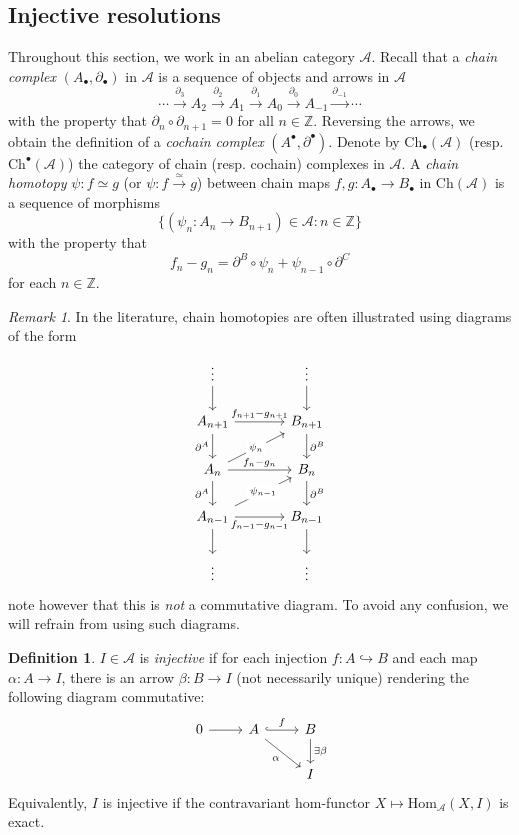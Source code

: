 \documentclass{article}
\def\~#1{\mathscr{#1}}
\def\To#1{\xrightarrow{#1}}
\numberwithin{equation}{section}
\numberwithin{figure}{section}
\newcommand{\Z}{\mathbb{Z}}
\newcommand{\Hom}{\mathrm{Hom}}
\newcommand{\mono}{\hookrightarrow}
\renewcommand{\d}{\partial}
\newcommand{\Ch}{\mathrm{Ch}}
\theoremstyle{plain}
\theoremstyle{definition}
\newtheorem{defn}[thm]{Definition}
\theoremstyle{remark}
\newtheorem*{rmk}{Remark}
\begin{document}
\subsection{Injective resolutions}
Throughout this section, we work in an abelian category $\~A$. Recall that a \emph{chain complex} $(A_\bullet, \d_\bullet)$ in $\~A$ is a sequence of objects and arrows in $\~A$
\[\cdots \To{\d_3} A_2 \To{\d_2} A_1 \To{\d_1} A_0 \To{\d_0} A_{-1} \To{\d_{-1}} \cdots\]
with the property that $\d_n \circ \d_{n+1} = 0$ for all $n \in \Z$. Reversing the arrows, we obtain the definition of a \emph{cochain complex} $(A^\bullet, \d^\bullet)$. Denote by $\Ch_\bullet(\~A)$ (resp. $\Ch^\bullet(\~A)$) the category of chain (resp. cochain) complexes in $\~A$. A \emph{chain homotopy} $\psi: f \simeq g$ (or $\psi: f \To{\simeq} g$) between chain maps $f,g: A_\bullet \to B_\bullet$ in $\Ch(\~A)$ is a sequence of morphisms 
\[\{(\psi_n: A_n \to B_{n + 1}) \in \~A : n \in \Z\}\]
with the property that 
\[f_n - g_n = \d^B \circ \psi_n + \psi_{n-1} \circ \d^C\]
for each $n \in \Z$.
\begin{rmk}
    In the literature, chain homotopies are often illustrated using diagrams of the form 
\[\begin{tikzcd}[column sep = scriptsize]
    \vdots && \vdots \\
    {A_{n+1}} && {B_{n+1}} \\
    {A_n} && {B_n} \\
    {A_{n-1}} && {B_{n-1}} \\
    \vdots && \vdots
    \arrow[from=1-1, to=2-1]
    \arrow[from=1-3, to=2-3]
    \arrow["{f_{n+ 1} - g_{n+1}}", from=2-1, to=2-3]
    \arrow["{\d^A}"', from=2-1, to=3-1]
    \arrow["{\d^B}", from=2-3, to=3-3]
    \arrow["{\psi_n}"{description}, from=3-1, to=2-3]
    \arrow["{f_n - g_n}", from=3-1, to=3-3]
    \arrow["{\d^A}"', from=3-1, to=4-1]
    \arrow["{\d^B}", from=3-3, to=4-3]
    \arrow["{\psi_{n-1}}"{description}, from=4-1, to=3-3]
    \arrow["{f_{n-1} - g_{n-1}}"', from=4-1, to=4-3]
    \arrow[from=4-1, to=5-1]
    \arrow[from=4-3, to=5-3]
\end{tikzcd}\]
note however that this is \emph{not} a commutative diagram. To avoid any confusion, we will refrain from using such diagrams.
\end{rmk}
\begin{defn}
    $I \in \~A$ is \emph{injective} if for each injection $f: A \mono B$ and each map $\alpha: A \to I$, there is an arrow $\beta: B \to I$ (not necessarily unique) rendering the following diagram commutative:
    \[\begin{tikzcd}
    0 & A & B \\
    && I
    \arrow[from=1-1, to=1-2]
    \arrow["f", hook, from=1-2, to=1-3]
    \arrow["\alpha"', from=1-2, to=2-3]
    \arrow["{\exists\beta}", from=1-3, to=2-3]
\end{tikzcd}\]
Equivalently, $I$ is injective if the contravariant hom-functor $X \mapsto \Hom_{\~A}(X, I)$ is exact.
\end{defn}
\end{document}

